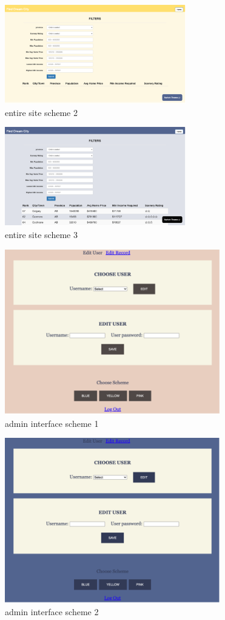 \documentclass[12pt, letterpaper]{article}
\begin{document}
 \begin{figure}[htbp]
	\centering
	\includegraphics[width=3.1in]{images/q14-2png.png}
	\caption{entire site scheme 2}
 \end{figure}

\begin{figure}[htbp]
	\centering
	\includegraphics[width=3.1in]{images/q14-3.png}
	\caption{entire site scheme 3}
 \end{figure}
 \newpage
 
 \begin{figure}[htbp]
	\centering
	\includegraphics[width=3.7in]{images/q14-4.png}
	\caption{admin interface scheme 1}
 \end{figure}
 
 \begin{figure}[htbp]
	\centering
	\includegraphics[width=3.7in]{images/q14-5.png}
	\caption{admin interface scheme 2}
 \end{figure}
 
\end{document}
